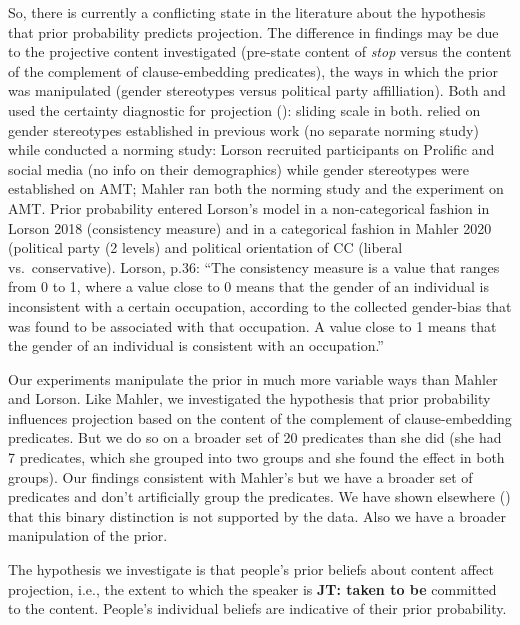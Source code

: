 \documentclass[11pt,fleqn]{article}
\newcommand{\6}{\mbox{$[\hspace*{-.6mm}[$}}
\newcommand{\9}{\mbox{$]\hspace*{-.6mm}]$}}
\newcommand{\jt}[1]{\textbf{\color{blue}JT: #1}}
\begin{document}
So, there is currently a conflicting state in the literature about the hypothesis that prior probability predicts projection. The difference in findings may be due to the projective content investigated (pre-state content of {\em stop} versus the content of the complement of clause-embedding predicates), the ways in which the prior was manipulated (gender stereotypes versus political party affilliation). Both \citealt{lorson2018} and \citealt{mahler2020} used the certainty diagnostic for projection (\citealt{tbd-variability}): sliding scale in both. \citealt{lorson2018} relied on gender stereotypes established in previous work (no separate norming study) while \citealt{mahler2020} conducted a norming study: Lorson recruited participants on Prolific and social media (no info on their demographics) while gender stereotypes were established on AMT; Mahler ran both the norming study and the experiment on AMT. Prior probability entered Lorson's model in a non-categorical fashion in Lorson 2018 (consistency measure) and in a categorical fashion in Mahler 2020 (political party (2 levels) and political orientation of CC (liberal vs.\ conservative). Lorson, p.36: ``The consistency measure is a value that ranges from 0 to 1, where a value close to 0 means that the gender of an individual is inconsistent with a certain occupation, according to the collected gender-bias that was found to be associated with that occupation. A value close to 1 means that the gender of an individual is consistent with an occupation.''

Our experiments manipulate the prior in much more variable ways than Mahler and Lorson. Like Mahler, we investigated the hypothesis that prior probability influences projection based on the content of the complement of clause-embedding predicates. But we do so on a broader set of 20 predicates than she did (she had 7 predicates, which she grouped into two groups and she found the effect in both groups). Our findings consistent with Mahler's but we have a broader set of predicates and don't artificially group the predicates. We have shown elsewhere (\citealt{tonhauser-degen-factive}) that this binary distinction is not supported by the data. Also we have a broader manipulation of the prior.

The hypothesis we investigate is that people's prior beliefs about content affect projection, i.e., the extent to which the speaker is \jt{taken to be} committed to the content. People's individual beliefs are indicative of their prior probability.
\end{document}
